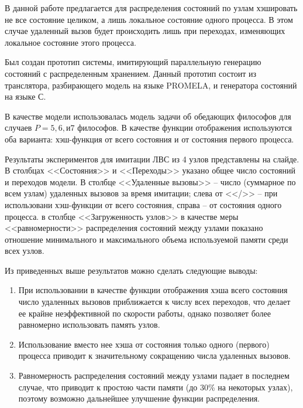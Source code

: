 \documentclass[a4paper,12pt,notitlepage]{article}
\begin{document}
В данной работе предлагается для распределения состояний по узлам
хэшировать не все состояние целиком, а лишь локальное состояние одного
процесса. В этом случае удаленный вызов будет происходить лишь при
переходах, изменяющих локальное состояние этого процесса.

Был создан прототип системы, имитирующий параллельную генерацию
состояний с распределенным хранением. Данный прототип состоит из
транслятора, разбирающего модель на языке PROMELA, и генератора
состояний на языке С.

В качестве модели использовалась модель задачи об обедающих философов
для случаев $P = 5, 6, \mbox{и} 7$ философов. В качестве функции
отображения используются оба варианта: хэш-функция от всего состояния
и от состояния первого процесса.

Результаты экспериментов для имитации ЛВС из 4 узлов представлены на
слайде. В столбцах <<Состояния>> и <<Переходы>> указано общее число
состояний и переходов модели. В столбце <<Удаленные вызовы>> -- число
(суммарное по всем узлам) удаленных вызовов за время имитации; слева
от <</>> -- при использовани хэш-функции от всего состояния, справа --
от состояния одного процесса. в столбце <<Загруженность узлов>> в
качестве меры <<равномерности>> распределения состояний между узлами
показано отношение минимального и максимального объема используемой
памяти среди всех узлов.

Из приведенных выше результатов можно сделать следующие выводы:

\begin{enumerate}
\item При использовании в качестве функции отображения хэша всего
  состояния число удаленных вызовов приближается к числу всех
  переходов, что делает ее крайне неэффективной по скорости работы,
  однако позволяет более равномерно использовать память узлов.

\item Использование вместо нее хэша от состояния только одного
  (первого) процесса приводит к значительному сокращению числа
  удаленных вызовов.

\item Равномерность распределения состояний между узлами падает в последнем
  случае, что приводит к простою части памяти  (до 30\% на некоторых узлах),
  поэтому возможно дальнейшее улучшение функции распределения.
\end{enumerate}
\end{document}
